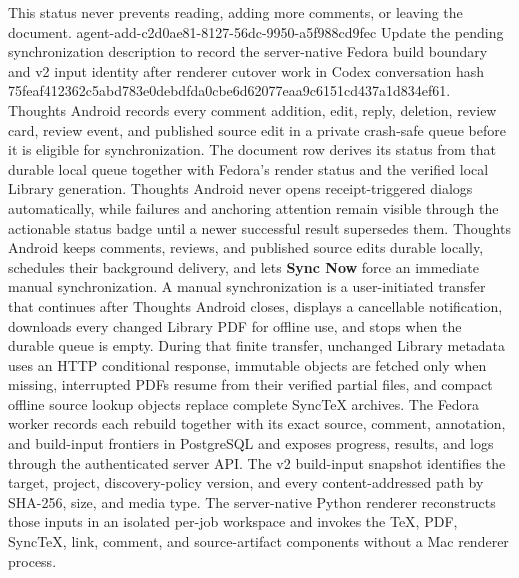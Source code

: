This status never prevents reading, adding more comments, or leaving the document.
\agentProposedEdit
  {agent-add-c2d0ae81-8127-56dc-9950-a5f988cd9fec}
  {Update the pending synchronization description to record the server-native Fedora build boundary and v2 input identity after renderer cutover work in Codex conversation hash 75feaf412362c5abd783e0debdfda0cbe6d62077eaa9c6151cd437a1d834ef61.}
  {}
  {Thoughts Android records every comment addition, edit, reply, deletion, review card, review event, and published source edit in a private crash-safe queue before it is eligible for synchronization.
The document row derives its status from that durable local queue together with Fedora's render status and the verified local Library generation.
Thoughts Android never opens receipt-triggered dialogs automatically, while failures and anchoring attention remain visible through the actionable status badge until a newer successful result supersedes them.
Thoughts Android keeps comments, reviews, and published source edits durable locally, schedules their background delivery, and lets \textbf{Sync Now} force an immediate manual synchronization.
A manual synchronization is a user-initiated transfer that continues after Thoughts Android closes, displays a cancellable notification, downloads every changed Library PDF for offline use, and stops when the durable queue is empty.
During that finite transfer, unchanged Library metadata uses an HTTP conditional response, immutable objects are fetched only when missing, interrupted PDFs resume from their verified partial files, and compact offline source lookup objects replace complete SyncTeX archives.
The Fedora worker records each rebuild together with its exact source, comment, annotation, and build-input frontiers in PostgreSQL and exposes progress, results, and logs through the authenticated server API.
The v2 build-input snapshot identifies the target, project, discovery-policy version, and every content-addressed path by SHA-256, size, and media type.
The server-native Python renderer reconstructs those inputs in an isolated per-job workspace and invokes the TeX, PDF, SyncTeX, link, comment, and source-artifact components without a Mac renderer process.}
